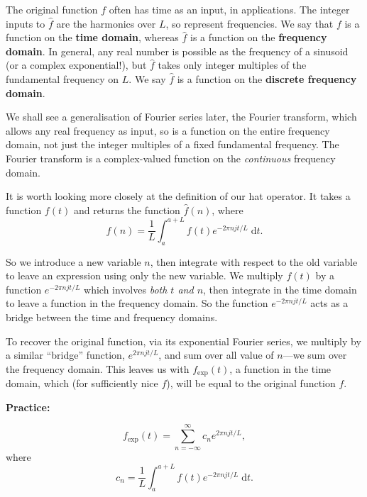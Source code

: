 \documentclass{article}
\newcommand{\diff}{\;\mathrm{d}}
\begin{document}
The original function $f$ often has time as an input, in applications. The integer inputs to $\hat{f}$ are the harmonics over $L$, so represent frequencies. We say that $f$ is a function on the \textbf{time domain}, whereas $\hat{f}$ is a function on the \textbf{frequency domain}. In general, any real number is possible as the frequency of a sinusoid (or a complex exponential!), but $\hat{f}$ takes only integer multiples of the fundamental frequency on $L$. We say $\hat{f}$ is a function on the \textbf{discrete frequency domain}.

We shall see a generalisation of Fourier series later, the Fourier transform, which allows any real frequency as input, so is a function on the entire frequency domain, not just the integer multiples of a fixed fundamental frequency. The Fourier transform is a complex-valued function on the \textit{continuous} frequency domain.

It is worth looking more closely at the definition of our hat operator. It takes a function $f(t)$ and returns the function $\hat{f}(n)$, where
\[\hat{f}(n)=\frac{1}{L}\int_a^{a+L}\!\! f(t)e^{-2\pi njt/L}\diff t.\]

So we introduce a new variable $n$, then integrate with respect to the old variable to leave an expression using only the new variable. We multiply $f(t)$ by a function $e^{-2\pi njt/L}$ which involves \textit{both $t$ and $n$}, then integrate in the time domain to leave a function in the frequency domain. So the function $e^{-2\pi njt/L}$ acts as a bridge between the time and frequency domains.

To recover the original function, via its exponential Fourier series, we multiply by a similar ``bridge'' function, $e^{2\pi njt/L}$, and sum over all value of $n$---we sum over the frequency domain. This leaves us with $f_\mathrm{exp}(t)$, a function in the time domain, which (for sufficiently nice $f$), will be equal to the original function $f$.


\clearpage










\textbf{Practice:}\bigskip

\[f_\mathrm{exp}(t)=\sum_{n=-\infty}^\infty c_ne^{2\pi njt/L},\]
where
\[c_n = \frac{1}{L}\int_a^{a+L}\!\! f(t)e^{-2\pi njt/L}\diff t.\]
\end{document}
